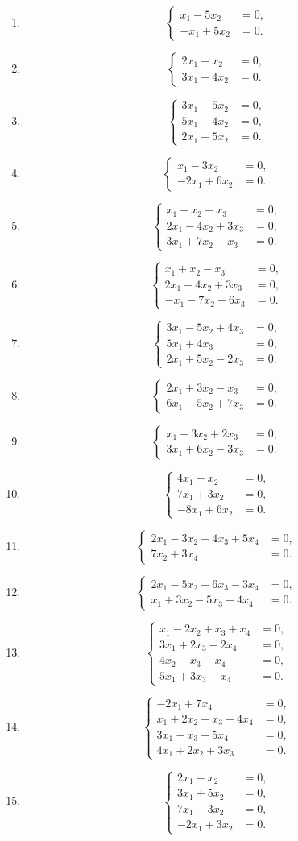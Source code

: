 \documentclass[12pt]{article}
\newcommand{\sistema}[1]{%
\[
\left\{
\begin{aligned}
#1
\end{aligned}
\right.
\]
}
\begin{document}
\begin{enumerate}[label=\textbf{H\arabic*.},leftmargin=*]
\item \sistema{x_1-5x_2&=0,\\-x_1+5x_2&=0.}
\item \sistema{2x_1-x_2&=0,\\3x_1+4x_2&=0.}
\item \sistema{3x_1-5x_2&=0,\\5x_1+4x_2&=0,\\2x_1+5x_2&=0.}
\item \sistema{x_1-3x_2&=0,\\-2x_1+6x_2&=0.}
\item \sistema{x_1+x_2-x_3&=0,\\2x_1-4x_2+3x_3&=0,\\3x_1+7x_2-x_3&=0.}
\item \sistema{x_1+x_2-x_3&=0,\\2x_1-4x_2+3x_3&=0,\\-x_1-7x_2-6x_3&=0.}
\item \sistema{3x_1-5x_2+4x_3&=0,\\5x_1+4x_3&=0,\\2x_1+5x_2-2x_3&=0.}
\item \sistema{2x_1+3x_2-x_3&=0,\\6x_1-5x_2+7x_3&=0.}
\item \sistema{x_1-3x_2+2x_3&=0,\\3x_1+6x_2-3x_3&=0.}
\item \sistema{4x_1-x_2&=0,\\7x_1+3x_2&=0,\\-8x_1+6x_2&=0.}
\item \sistema{2x_1-3x_2-4x_3+5x_4&=0,\\7x_2+3x_4&=0.}
\item \sistema{2x_1-5x_2-6x_3-3x_4&=0,\\x_1+3x_2-5x_3+4x_4&=0.}
\item \sistema{x_1-2x_2+x_3+x_4&=0,\\3x_1+2x_3-2x_4&=0,\\4x_2-x_3-x_4&=0,\\5x_1+3x_3-x_4&=0.}
\item \sistema{-2x_1+7x_4&=0,\\x_1+2x_2-x_3+4x_4&=0,\\3x_1-x_3+5x_4&=0,\\4x_1+2x_2+3x_3&=0.}
\item \sistema{2x_1-x_2&=0,\\3x_1+5x_2&=0,\\7x_1-3x_2&=0,\\-2x_1+3x_2&=0.}

\end{enumerate}
\end{document}
